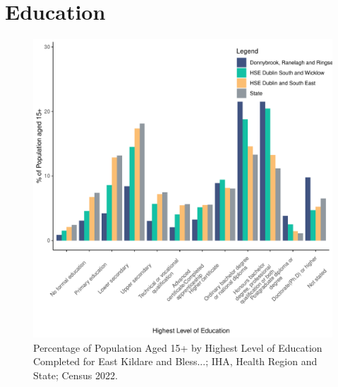 \documentclass{article}
\begin{document}
\section{Education}\label{sect:Edu}
\begin{figure}[H]
	\centering
	\includegraphics[width = 120mm]{../figures/EduED.pdf}
	\caption{Percentage of Population Aged 15+ by Highest Level of Education Completed for East Kildare and Bless...; IHA, Health Region and State; Census 2022.}
	\label{fig:vbnv}
	\end{figure}
\end{document}
